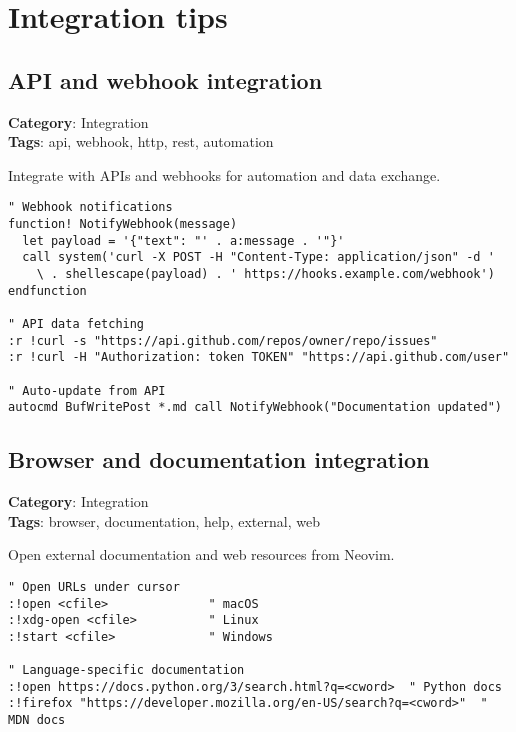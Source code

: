 {{{{{{\chapter{Integration tips}
\section{API and webhook integration}

\textbf{Category}: Integration\\ \textbf{Tags}: api, webhook, http, rest, automation
\vspace{0.5cm}

Integrate with APIs and webhooks for automation and data exchange.

\begin{Exa*}{}
\begin{Verbatim}[fontsize=\footnotesize, breaklines, breakanywhere]
" Webhook notifications
function! NotifyWebhook(message)
  let payload = '{"text": "' . a:message . '"}'
  call system('curl -X POST -H "Content-Type: application/json" -d ' 
    \ . shellescape(payload) . ' https://hooks.example.com/webhook')
endfunction

" API data fetching
:r !curl -s "https://api.github.com/repos/owner/repo/issues"
:r !curl -H "Authorization: token TOKEN" "https://api.github.com/user"

" Auto-update from API
autocmd BufWritePost *.md call NotifyWebhook("Documentation updated")
\end{Verbatim}
\end{Exa*}

\section{Browser and documentation integration}

\textbf{Category}: Integration\\ \textbf{Tags}: browser, documentation, help, external, web
\vspace{0.5cm}

Open external documentation and web resources from Neovim.

\begin{Exa*}{}
\begin{Verbatim}[fontsize=\footnotesize, breaklines, breakanywhere]
" Open URLs under cursor
:!open <cfile>              " macOS
:!xdg-open <cfile>          " Linux
:!start <cfile>             " Windows

" Language-specific documentation
:!open https://docs.python.org/3/search.html?q=<cword>  " Python docs
:!firefox "https://developer.mozilla.org/en-US/search?q=<cword>"  " MDN docs


\end{Verbatim}
\end{Exa*}}}}}}}
